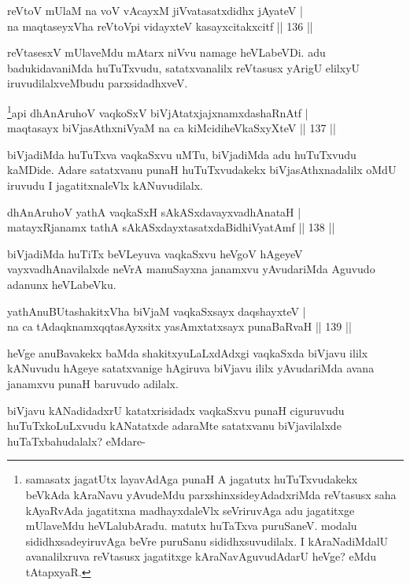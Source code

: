 \begin{shl}
reVtoV mUlaM na voV vAcayxM jiVvatasatxdidhx jAyateV |\\
na maqtaseyxVha reVtoV\s pi vidayxteV kasayxcitakxcitf \hfill || 136 ||
\end{shl}

\begin{artha}
reVtasesxV mUlaveMdu mAtarx niVvu namage heVLabeVDi. adu badukidavaniMda huTuTxvudu, satatxvanalilx reVtasusx yArigU elilxyU iruvudilalxveMbudu parxsidadhxveV.
\end{artha}

\begin{shl}
\footnote{samasatx jagatUtx layavAdAga punaH A jagatutx huTuTxvudakekx beVkAda kAraNavu yAvudeMdu parxshinxsideyAdadxriMda reVtasusx saha kAyaRvAda jagatitxna madhayxdaleVlx seVriruvAga adu jagatitxge mUlaveMdu heVLalubAradu. matutx huTaTxva puruSaneV. modalu sididhxsadeyiruvAga beVre puruSanu sididhxsuvudilalx. I kAraNadiMdalU avanalilxruva reVtasusx jagatitxge kAraNavAguvudAdarU heVge? eMdu tAtapxyaR.}api dhAnAruhoV vaqkoSxV biVjAtatxjajxnamxdashaRnAtf |\\
maqtasayx biVjasAthxniVyaM na ca kiMcidiheVkaSxyXteV \hfill || 137 ||
\end{shl}

\begin{artha}
biVjadiMda huTuTxva vaqkaSxvu uMTu, biVjadiMda adu huTuTxvudu kaMDide. Adare satatxvanu punaH huTuTxvudakekx biVjasAthxnadalilx oMdU iruvudu I jagatitxnaleVlx kANuvudilalx.
\end{artha}%

\begin{shl}
dhAnAruhoV yathA vaqkaSxH sAkASxdavayxvadhAnataH |\\
matayxRjanamx tathA sAkASxdayxtasatxdaBidhiVyatAmf \hfill || 138 ||
\end{shl}

\begin{artha}
biVjadiMda huTiTx beVLeyuva vaqkaSxvu heVgoV hAgeyeV vayxvadhAnavilalxde neVrA manuSayxna janamxvu yAvudariMda Aguvudo adanunx heVLabeVku.
\end{artha}

\begin{shl}
yathA\s nuBUtashakitxVha biVjaM vaqkaSxsayx daqshayxteV |\\
na ca tAdaqknamxqqtasAyxsitx yasAmxtatxsayx punaBaRvaH \hfill || 139 ||
\end{shl}

\begin{artha}
heVge anuBavakekx baMda shakitxyuLaLxdAdxgi vaqkaSxda biVjavu ililx kANuvudu hAgeye satatxvanige hAgiruva biVjavu ililx yAvudariMda avana janamxvu punaH baruvudo adilalx.

biVjavu kANadidadxrU katatxrisidadx vaqkaSxvu punaH ciguruvudu huTuTxkoLuLxvudu kANatatxde adaraMte satatxvanu biVjavilalxde huTaTxbahudalalx? eMdare-
\end{artha}

